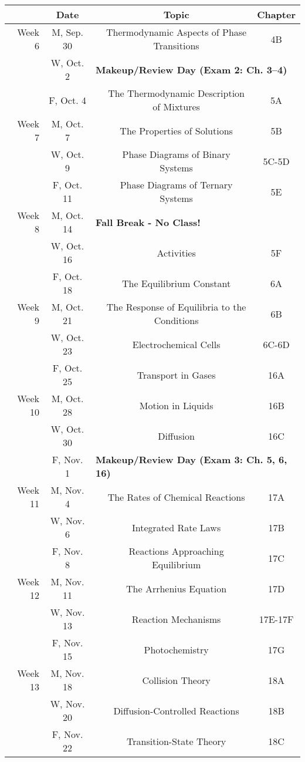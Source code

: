 \documentclass[12pt, letterpaper]{article}
\begin{document}
\noindent
\begin{tabular}{rcccc}
& Date && Topic & Chapter\\
\midrule
Week 6 & M, Sep. 30&& Thermodynamic Aspects of Phase Transitions & 4B\\
& W, Oct. 2& \multicolumn{3}{l}{\textbf{Makeup/Review Day (Exam 2: Ch. 3--4)}}\\
& F, Oct. 4&& The Thermodynamic Description of Mixtures & 5A\\
\midrule
Week 7 & M, Oct. 7&& The Properties of Solutions & 5B\\
& W, Oct. 9&& Phase Diagrams of Binary Systems & 5C-5D\\
& F, Oct. 11&& Phase Diagrams of Ternary Systems & 5E\\
\midrule
Week 8 & M, Oct. 14& \multicolumn{3}{l}{\textbf{Fall Break - No Class!}}\\
& W, Oct. 16&& Activities & 5F\\
& F, Oct. 18&& The Equilibrium Constant & 6A\\
\midrule
Week 9 & M, Oct. 21&& The Response of Equilibria to the Conditions & 6B\\
& W, Oct. 23&& Electrochemical Cells & 6C-6D\\
& F, Oct. 25&& Transport in Gases & 16A\\
\midrule
Week 10 & M, Oct. 28&& Motion in Liquids & 16B\\
& W, Oct. 30&& Diffusion & 16C\\
& F, Nov. 1& \multicolumn{3}{l}{\textbf{Makeup/Review Day (Exam 3: Ch. 5, 6, 16)}}\\
\midrule
Week 11 & M, Nov. 4&& The Rates of Chemical Reactions & 17A\\
& W, Nov. 6&& Integrated Rate Laws & 17B\\
& F, Nov. 8&& Reactions Approaching Equilibrium & 17C\\
\midrule
Week 12 & M, Nov. 11&& The Arrhenius Equation & 17D\\
& W, Nov. 13&& Reaction Mechanisms & 17E-17F\\
& F, Nov. 15&& Photochemistry & 17G\\
\midrule
Week 13 & M, Nov. 18&& Collision Theory & 18A\\
& W, Nov. 20&& Diffusion-Controlled Reactions & 18B\\
& F, Nov. 22&& Transition-State Theory & 18C\\
\end{tabular}
\end{document}
